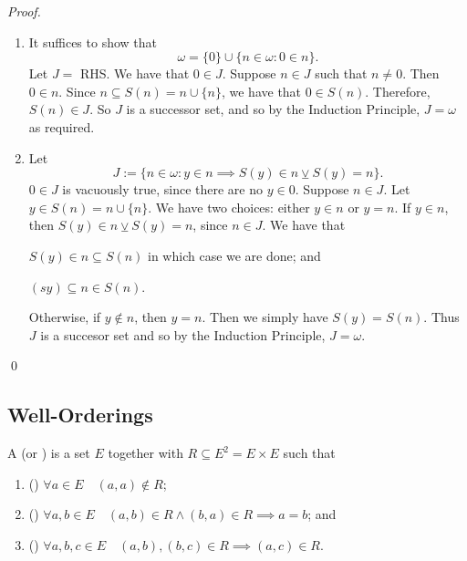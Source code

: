 \documentclass[notoc,notitlepage]{tufte-book}
\begin{document}
\begin{proof}
\begin{enumerate}
    \item It suffices to show that
      \begin{equation*}
        \omega = \{0\} \cup \{ n \in \omega: 0 \in n \}.
      \end{equation*}
      Let $J =$ RHS. We have that $0 \in J$. Suppose $n \in J$ such that $n \neq 0$. Then $0 \in n$. Since $n \subseteq S(n) = n \cup \{n\}$, we have that $0 \in S(n)$. Therefore, $S(n) \in J$. So $J$ is a successor set, and so by the Induction Principle, $J = \omega$ as required.

    \item Let
      \begin{equation*}
        J := \{ n \in \omega : y \in n \implies S(y) \in n \veebar S(y) = n \}.
      \end{equation*}
      $0 \in J$ is vacuously true, since there are no $y \in 0$. Suppose $n \in J$. Let $y \in S(n) = n \cup \{ n \}$. We have two choices: either $y \in n$ or $y = n$. If $y \in n$, then $S(y) \in n \veebar S(y) = n$, since $n \in J$. We have that

      $S(y) \in n \subseteq S(n)$ in which case we are done; and

      $(sy) \subseteq n \in S(n)$.

      Otherwise, if $y \notin n$, then $y = n$. Then we simply have $S(y) = S(n)$. Thus $J$ is a succesor set and so by the Induction Principle, $J = \omega$.
  \end{enumerate}\qed
\end{proof}


\subsection{Well-Orderings}%
\label{sub:well_orderings}

\begin{defn}
\label{defn:strict_partially_ordered_set}
  A  (or ) is a set $E$ together with $R \subseteq E^2 = E \times E$ such that
  \begin{enumerate}
    \item () $\forall a \in E \quad (a, a) \notin R$;
    \item () $\forall a, b \in E \quad (a, b) \in R \land (b, a) \in R \implies a = b$; and
    \item () $\forall a, b, c \in E \quad (a, b), (b, c) \in R \implies (a, c) \in R$.
  \end{enumerate}
\end{defn}
\end{document}
